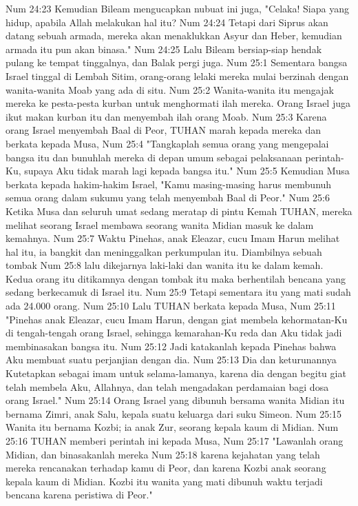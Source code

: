Num 24:23  Kemudian Bileam mengucapkan nubuat ini juga, "Celaka! Siapa yang hidup, apabila Allah melakukan hal itu?
Num 24:24  Tetapi dari Siprus akan datang sebuah armada, mereka akan menaklukkan Asyur dan Heber, kemudian armada itu pun akan binasa."
Num 24:25  Lalu Bileam bersiap-siap hendak pulang ke tempat tinggalnya, dan Balak pergi juga.
Num 25:1  Sementara bangsa Israel tinggal di Lembah Sitim, orang-orang lelaki mereka mulai berzinah dengan wanita-wanita Moab yang ada di situ.
Num 25:2  Wanita-wanita itu mengajak mereka ke pesta-pesta kurban untuk menghormati ilah mereka. Orang Israel juga ikut makan kurban itu dan menyembah ilah orang Moab.
Num 25:3  Karena orang Israel menyembah Baal di Peor, TUHAN marah kepada mereka dan berkata kepada Musa,
Num 25:4  "Tangkaplah semua orang yang mengepalai bangsa itu dan bunuhlah mereka di depan umum sebagai pelaksanaan perintah-Ku, supaya Aku tidak marah lagi kepada bangsa itu."
Num 25:5  Kemudian Musa berkata kepada hakim-hakim Israel, "Kamu masing-masing harus membunuh semua orang dalam sukumu yang telah menyembah Baal di Peor."
Num 25:6  Ketika Musa dan seluruh umat sedang meratap di pintu Kemah TUHAN, mereka melihat seorang Israel membawa seorang wanita Midian masuk ke dalam kemahnya.
Num 25:7  Waktu Pinehas, anak Eleazar, cucu Imam Harun melihat hal itu, ia bangkit dan meninggalkan perkumpulan itu. Diambilnya sebuah tombak
Num 25:8  lalu dikejarnya laki-laki dan wanita itu ke dalam kemah. Kedua orang itu ditikamnya dengan tombak itu maka berhentilah bencana yang sedang berkecamuk di Israel itu.
Num 25:9  Tetapi sementara itu yang mati sudah ada 24.000 orang.
Num 25:10  Lalu TUHAN berkata kepada Musa,
Num 25:11  "Pinehas anak Eleazar, cucu Imam Harun, dengan giat membela kehormatan-Ku di tengah-tengah orang Israel, sehingga kemarahan-Ku reda dan Aku tidak jadi membinasakan bangsa itu.
Num 25:12  Jadi katakanlah kepada Pinehas bahwa Aku membuat suatu perjanjian dengan dia.
Num 25:13  Dia dan keturunannya Kutetapkan sebagai imam untuk selama-lamanya, karena dia dengan begitu giat telah membela Aku, Allahnya, dan telah mengadakan perdamaian bagi dosa orang Israel."
Num 25:14  Orang Israel yang dibunuh bersama wanita Midian itu bernama Zimri, anak Salu, kepala suatu keluarga dari suku Simeon.
Num 25:15  Wanita itu bernama Kozbi; ia anak Zur, seorang kepala kaum di Midian.
Num 25:16  TUHAN memberi perintah ini kepada Musa,
Num 25:17  "Lawanlah orang Midian, dan binasakanlah mereka
Num 25:18  karena kejahatan yang telah mereka rencanakan terhadap kamu di Peor, dan karena Kozbi anak seorang kepala kaum di Midian. Kozbi itu wanita yang mati dibunuh waktu terjadi bencana karena peristiwa di Peor."

